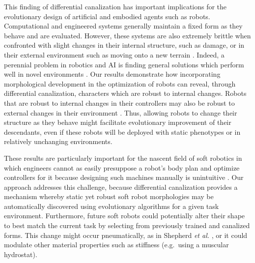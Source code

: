 This finding of differential canalization has important implications for the evolutionary design of artificial and embodied agents such as robots.
Computational and engineered systems generally maintain a fixed form as they behave and are evaluated.
However, these systems are also extremely brittle when confronted with slight changes in their internal structure, such as damage, 
or in their external environment such as moving onto a new terrain
\cite{french1999catastrophic,carlson2005ugvs,bongard2006resilient}.
Indeed, a perennial problem in robotics and AI is finding general solutions which perform well in novel environments 
\cite{koos2013transferability,nguyen2015deep}.
Our results demonstrate how incorporating morphological development in the optimization of robots can reveal, through differential canalization, characters which are robust to internal changes.
Robots that are robust to internal changes in their controllers may also be robust to external changes in their environment \cite{bongard2011morphological}.
Thus, allowing robots to change their structure as they behave might facilitate evolutionary improvement of their descendants, even if these robots will be deployed with static phenotypes or in relatively unchanging environments.

These results are particularly important for the nascent field of soft robotics in which engineers cannot as easily presuppose a robot's body plan and optimize controllers for it because designing such machines manually is unintuitive
\cite{lipson2014challenges,pfeifer2012challenges}.
Our approach addresses this challenge, because differential canalization provides a mechanism whereby static yet robust soft robot morphologies may be automatically discovered using evolutionary algorithms for a given task environment.
Furthermore, future soft robots could potentially alter their shape to best match the current task by selecting from previously trained and canalized forms.
This change might occur pneumatically, as in Shepherd \textit{et al.} \cite{shepherd2011multigait}, or it could modulate other material properties such as stiffness (e.g.~using a muscular hydrostat).

